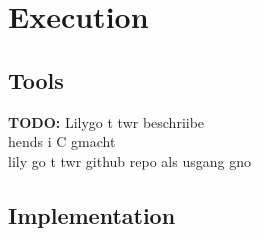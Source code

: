 \chapter{Execution}
\section{Tools}
\textbf{TODO: } Lilygo t twr beschriibe \\
hends i C gmacht \\
lily go t twr github repo als usgang gno 

\section{Implementation}


